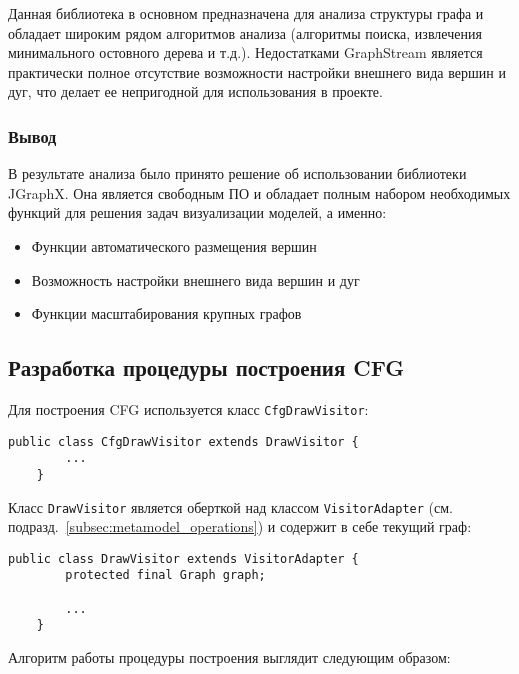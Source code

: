 Данная библиотека в основном предназначена для анализа структуры графа и
обладает широким рядом алгоритмов анализа (алгоритмы поиска, извлечения
минимального остовного дерева и т.д.). Недостатками GraphStream является
практически полное отсутствие возможности настройки внешнего вида вершин и дуг,
что делает ее непригодной для использования в проекте.

\subsubsection{Вывод}

В результате анализа было принято решение об использовании библиотеки JGraphX.
Она является свободным ПО и обладает полным набором необходимых функций для
решения задач визуализации моделей, а именно:

\begin{itemize}
    \item Функции автоматического размещения вершин
    \item Возможность настройки внешнего вида вершин и дуг
    \item Функции масштабирования крупных графов
\end{itemize}

\subsection{Разработка процедуры построения CFG}

Для построения CFG используется класс \texttt{CfgDrawVisitor}:

\begin{lstlisting}[caption={Класс CfgDrawVisitor}]
    public class CfgDrawVisitor extends DrawVisitor {
        ...
    }
\end{lstlisting}

Класс \texttt{DrawVisitor} является оберткой над классом \texttt{VisitorAdapter}
(см. подразд.~\ref{subsec:metamodel_operations}) и содержит в себе текущий граф:

\begin{lstlisting}[caption={Класс DrawVisitor}]
    public class DrawVisitor extends VisitorAdapter {
        protected final Graph graph;

        ...
    }
\end{lstlisting}

Алгоритм работы процедуры построения выглядит следующим образом:

